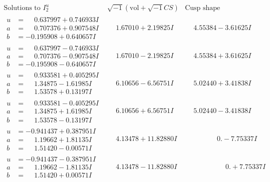 \documentclass[1p]{elsarticle_modified}
\theoremstyle{definition}
\newcommand{\I}{\sqrt{-1}}
\begin{document}
$$\begin{array}{c|c|c}  
\text{Solutions to }I^u_{2}& \I (\text{vol} + \sqrt{-1}CS) & \text{Cusp shape}\\
 \hline 
\begin{aligned}
u &= \phantom{-}0.637997 + 0.746933 I \\
a &= \phantom{-}0.707376 + 0.907548 I \\
b &= -0.195908 + 0.640657 I\end{aligned}
 & \phantom{-}1.67010 + 2.19825 I & \phantom{-}4.55384 - 3.61625 I \\ \hline\begin{aligned}
u &= \phantom{-}0.637997 - 0.746933 I \\
a &= \phantom{-}0.707376 - 0.907548 I \\
b &= -0.195908 - 0.640657 I\end{aligned}
 & \phantom{-}1.67010 - 2.19825 I & \phantom{-}4.55384 + 3.61625 I \\ \hline\begin{aligned}
u &= \phantom{-}0.933581 + 0.405295 I \\
a &= \phantom{-}1.34875 - 1.61985 I \\
b &= \phantom{-}1.53578 + 0.13197 I\end{aligned}
 & \phantom{-}6.10656 - 6.56751 I & \phantom{-}5.02440 + 3.41838 I \\ \hline\begin{aligned}
u &= \phantom{-}0.933581 - 0.405295 I \\
a &= \phantom{-}1.34875 + 1.61985 I \\
b &= \phantom{-}1.53578 - 0.13197 I\end{aligned}
 & \phantom{-}6.10656 + 6.56751 I & \phantom{-}5.02440 - 3.41838 I \\ \hline\begin{aligned}
u &= -0.941437 + 0.387951 I \\
a &= \phantom{-}1.19662 + 1.81135 I \\
b &= \phantom{-}1.51420 - 0.00571 I\end{aligned}
 & \phantom{-}4.13478 + 11.82880 I & \phantom{-0.000000 } 0. - 7.75337 I \\ \hline\begin{aligned}
u &= -0.941437 - 0.387951 I \\
a &= \phantom{-}1.19662 - 1.81135 I \\
b &= \phantom{-}1.51420 + 0.00571 I\end{aligned}
 & \phantom{-}4.13478 - 11.82880 I & \phantom{-0.000000 -}0. + 7.75337 I \\ \hline\begin{aligned}

\end{aligned}
\end{array}$$
\end{document}

